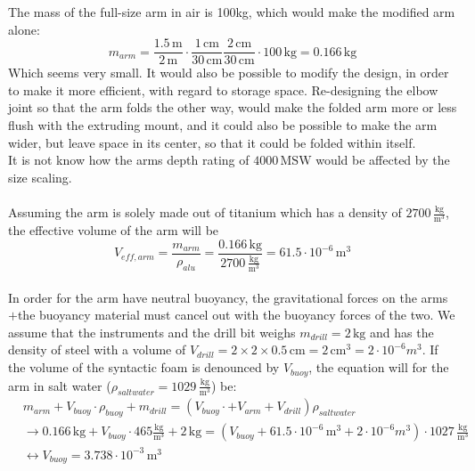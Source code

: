 The mass of the full-size arm in air is 100kg, which would make the modified arm alone:
\begin{equation}
m_{arm}=\frac{1.5\,\mathrm{m}}{2\,\mathrm{m}}\cdot\frac{1\,\mathrm{cm}}{30\,\mathrm{cm}}\frac{2\,\mathrm{cm}}{30\,\mathrm{cm}}\cdot 100\,\mathrm{kg}=0.166\,\mathrm{kg}
\end{equation}
Which seems very small. It would also be possible to modify the design, in order to make it more efficient, with regard to storage space. Re-designing the elbow joint so that the arm folds the other way, would make the folded arm more or less flush with the extruding mount, and it could also be possible to make the arm wider, but leave space in its center, so that it could be folded within itself.\\
It is not know how the arms depth rating of $4000\,\mathrm{MSW}$ would be affected by the size scaling.\\
\\
Assuming the arm is solely made out of titanium which has a density of $2700\,\frac{\mathrm{kg}}{\mathrm{m^3}}$, the effective volume of the arm will be 
\begin{equation}
V_{eff,arm}=\frac{m_{arm}}{\rho_{alu}}=\frac{0.166\,\mathrm{kg}}{2700\,\mathrm{\frac{kg}{m^3}}}=61.5\cdot 10^{-6} \, \mathrm{m^3}
\end{equation}
\\
In order for the arm have neutral buoyancy, the gravitational forces on the arms$+$the buoyancy material must cancel out with the buoyancy forces of the two. We assume that the instruments and the drill bit weighs $m_{drill}=2\,\mathrm{kg}$ and has the density of steel with a volume of $V_{drill}=2\times 2 \times 0.5 \, \mathrm{cm}=2\,\mathrm{cm^3}=2\cdot 10^{-6}m^3$. If the volume of the syntactic foam is denounced by $V_{buoy}$, the equation will for the arm in salt water ($\rho_{saltwater}=1029 \, \mathrm{\frac{kg}{m^3}}$) be:
\begin{equation}
\begin{split}
&m_{arm}+V_{buoy}\cdot \rho_{buoy} + m_{drill}=(V_{buoy}\cdot + V_{arm}+V_{drill})\rho_{saltwater}\\
&\rightarrow 0.166\,\mathrm{kg}+V_{buoy}\cdot 465 \mathrm{\frac{kg}{m^3}}+2\,\mathrm{kg}=(V_{buoy}+61.5\cdot 10^{-6}\,\mathrm{m^3}+2\cdot 10^{-6}m^3)\cdot 1027 \,\mathrm{\frac{kg}{m^3}}\\
& \leftrightarrow V_{buoy} = 3.738\cdot 10^{-3}\,\mathrm{m^3}
\end{split}
\end{equation}
